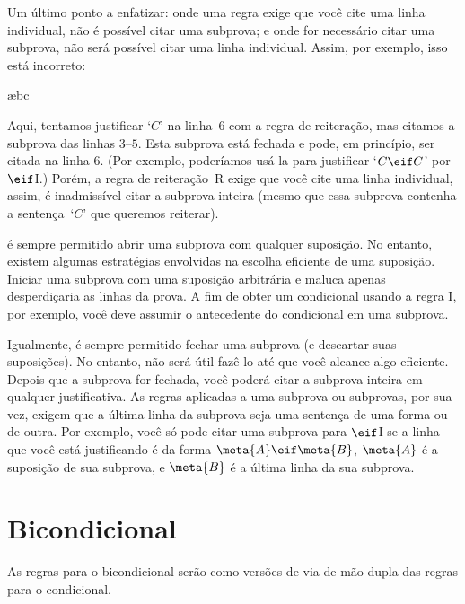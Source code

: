 Um último ponto a enfatizar: onde uma regra exige que você cite uma linha individual, não é possível citar uma subprova; e onde for necessário citar uma subprova, não será possível citar uma linha individual.  Assim, por exemplo, isso está incorreto:
\begin{fitchproof}
\open
	\open
	\ae{bc}
	\close
 
\close
{}
\end{fitchproof}
Aqui, tentamos justificar `$C$' na linha~$6$ com a regra de reiteração, mas citamos a subprova das linhas $3$--$5$. Esta subprova está fechada e pode, em princípio, ser citada na linha 6.  (Por exemplo, poderíamos usá-la para justificar 
 `$C \eif C$' por $\eif$I.) Porém,  a regra de reiteração~R exige que você cite uma linha individual, assim, é inadmissível citar a subprova inteira (mesmo que essa subprova  contenha a sentença~`$C$'  que queremos reiterar).

 

é sempre permitido abrir uma subprova com qualquer suposição.  No entanto, existem algumas estratégias envolvidas na escolha eficiente de uma suposição.
Iniciar uma subprova com uma suposição arbitrária e maluca apenas desperdiçaria as linhas da prova.  A fim de obter um condicional usando a regra {\eif}I, por exemplo, você deve assumir o antecedente do condicional em uma subprova.

Igualmente, é sempre permitido fechar uma subprova (e descartar suas suposições). No entanto, não será útil fazê-lo até que você alcance algo eficiente.  Depois que a subprova for fechada, você poderá citar a subprova inteira em qualquer justificativa.  As regras aplicadas a uma subprova ou subprovas, por sua vez, exigem que  a última linha da subprova seja uma sentença de uma forma ou de outra.   Por exemplo, você só pode citar uma subprova para $\eif$I se a linha que você está justificando é da forma $\meta{A} \eif \meta{B}$, $\meta{A}$  é a suposição de sua subprova, e $\meta{B}$ é a última linha da sua subprova.


\section{Bicondicional}
As regras para o bicondicional serão como versões de via de mão dupla das regras para o condicional. 

